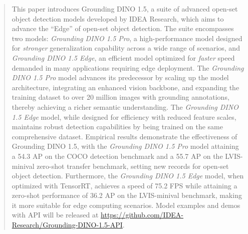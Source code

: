 \begin{abstract}




This paper introduces Grounding DINO 1.5, a suite of advanced open-set object detection models developed by IDEA Research, which aims to advance the “Edge”{\footnotemark[1]} of open-set object detection.
The suite encompasses two models: \textit{Grounding DINO 1.5 Pro}, a high-performance model designed for \emph{stronger} generalization capability across a wide range of scenarios, and \textit{Grounding DINO 1.5 Edge}, an efficient model optimized for \emph{faster} speed demanded in many applications requiring edge deployment.
The \textit{Grounding DINO 1.5 Pro} model advances its predecessor by scaling up the model architecture, integrating an enhanced vision backbone, and expanding the training dataset to over 20 million images with grounding annotations, thereby achieving a richer semantic understanding.
The \textit{Grounding DINO 1.5 Edge} model, while designed for efficiency with reduced feature scales, maintains robust detection capabilities by being trained on the same comprehensive dataset.
Empirical results demonstrate the effectiveness of Grounding DINO 1.5, with the \textit{Grounding DINO 1.5 Pro} model attaining a 54.3 AP on the COCO detection benchmark and a 55.7 AP on the LVIS-minival zero-shot transfer benchmark, setting new records for open-set object detection. Furthermore, the \textit{Grounding DINO 1.5 Edge} model, when optimized with TensorRT, achieves a speed of 75.2 FPS while attaining a zero-shot performance of 36.2 AP on the LVIS-minival benchmark, making it more suitable for edge computing scenarios. Model examples and demos with API will be released at \href{https://github.com/IDEA-Research/Grounding-DINO-1.5-API}{https://github.com/IDEA-Research/Grounding-DINO-1.5-API}.


\end{abstract}
